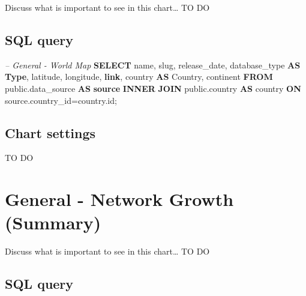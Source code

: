 \documentclass[]{book}
\newenvironment{Shaded}{\begin{snugshade}}{\end{snugshade}}
\newcommand{\KeywordTok}[1]{\textcolor[rgb]{0.13,0.29,0.53}{\textbf{#1}}}
\newcommand{\CommentTok}[1]{\textcolor[rgb]{0.56,0.35,0.01}{\textit{#1}}}
\newcommand{\NormalTok}[1]{#1}
\begin{document}
Discuss what is important to see in this chart\ldots{} TO DO

\subsection{SQL query}\label{sql-query-2}

\begin{Shaded}
\begin{Highlighting}[]
\CommentTok{--    General - World Map}
\KeywordTok{SELECT}\NormalTok{  name,}
\NormalTok{        slug,}
\NormalTok{        release_date,}
\NormalTok{        database_type }\KeywordTok{AS} \KeywordTok{Type}\NormalTok{,}
\NormalTok{        latitude,}
\NormalTok{        longitude,}
        \KeywordTok{link}\NormalTok{,}
\NormalTok{        country }\KeywordTok{AS}\NormalTok{ Country,}
\NormalTok{        continent}
\KeywordTok{FROM}\NormalTok{ public.data_source }\KeywordTok{AS} \KeywordTok{source} \KeywordTok{INNER} \KeywordTok{JOIN}\NormalTok{ public.country }
    \KeywordTok{AS}\NormalTok{ country }\KeywordTok{ON}\NormalTok{ source.country_id=country.id;}
\end{Highlighting}
\end{Shaded}

\subsection{Chart settings}\label{chart-settings-2}

TO DO

\section{General - Network Growth
(Summary)}\label{general---network-growth-summary}

Discuss what is important to see in this chart\ldots{} TO DO

\subsection{SQL query}\label{sql-query-3}
\end{document}
